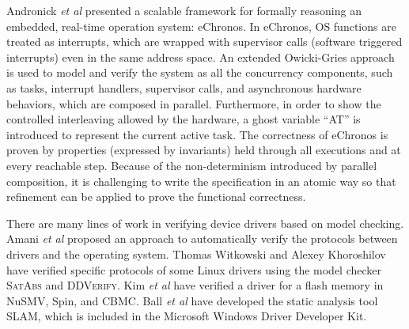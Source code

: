 Andronick {\em et al} \cite{Andronick2015, Andronick2016} presented
a scalable framework for formally reasoning an
embedded, real-time operation system: eChronos. In eChronos, OS functions are
treated as interrupts, which are wrapped with supervisor calls (software triggered
interrupts) even in the same address space. An extended Owicki-Gries approach
is used to model and verify the system as all the concurrency components,
such as tasks, interrupt handlers, supervisor calls, and asynchronous hardware
behaviors, which are composed in parallel. Furthermore, in order to show the
controlled interleaving allowed by the hardware, a ghost variable ``AT'' is
introduced to represent the current active task. The correctness of eChronos
is proven by properties (expressed by invariants) held through all
executions and at every reachable step.  Because of the non-determinism
introduced by parallel composition, it is challenging to write the
specification in an atomic way so that refinement can be applied to prove the
functional correctness.

There are many lines of work in verifying device drivers based on
model checking. Amani {\em et al} \cite{Amani12} proposed an approach
to automatically verify the protocols between drivers and the
operating system.  Thomas Witkowski \cite{witkowski2007} and Alexey
Khoroshilov \cite{Khoroshilov2010} have verified specific protocols of
some Linux drivers using the model checker \textsc{SatAbs} and
\textsc{DDVerify}.  Kim {\em et al} \cite{Kim2008} have verified a
driver for a flash memory in NuSMV, Spin, and CBMC.  Ball {\em et al}
\cite{slam2} have developed the static analysis tool SLAM, which is
included in the Microsoft Windows Driver Developer Kit.
